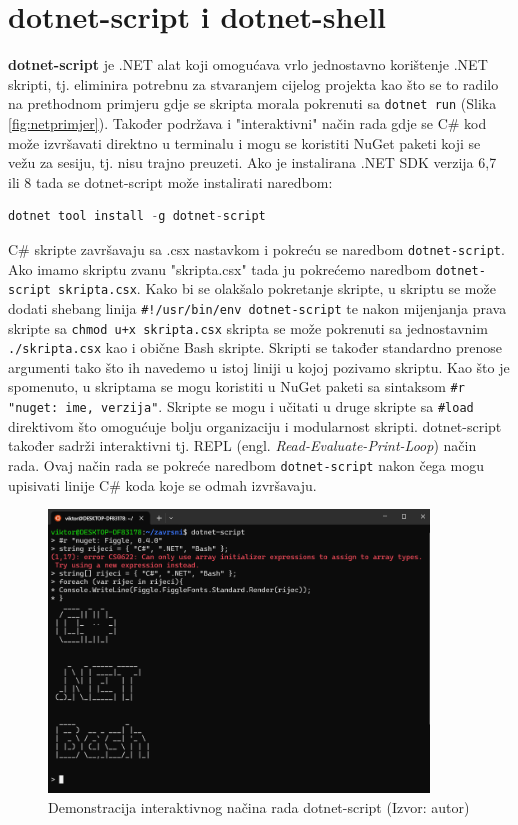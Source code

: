 \documentclass{foi}
\begin{document}
\chapter{dotnet-script i dotnet-shell}
\textbf{dotnet-script} je .NET alat koji omogućava vrlo jednostavno korištenje .NET skripti, tj. eliminira potrebnu za stvaranjem cijelog projekta kao što se to radilo na prethodnom primjeru gdje se skripta morala pokrenuti sa \verb|dotnet run| (Slika \ref{fig:netprimjer}). Također podržava i "interaktivni" način rada gdje se C\# kod može izvršavati direktno u terminalu i mogu se koristiti NuGet paketi koji se vežu za sesiju, tj. nisu trajno preuzeti. Ako je instalirana .NET SDK verzija 6,7 ili 8 tada se dotnet-script može instalirati naredbom\cite{gitscript}:
\begin{lstlisting}[language=C++]
dotnet tool install -g dotnet-script
\end{lstlisting}
C\# skripte završavaju sa .csx nastavkom i pokreću se naredbom \verb|dotnet-script|. Ako imamo skriptu zvanu "skripta.csx" tada ju pokrećemo naredbom \verb|dotnet-script skripta.csx|. Kako bi se olakšalo pokretanje skripte, u skriptu se može dodati shebang linija \texttt{\#!/usr/bin/env dotnet-script} te nakon mijenjanja prava skripte sa \verb|chmod u+x skripta.csx| skripta se može pokrenuti sa jednostavnim \verb|./skripta.csx| kao i obične Bash skripte. Skripti se također standardno prenose argumenti tako što ih navedemo u istoj liniji u kojoj pozivamo skriptu. Kao što je spomenuto, u skriptama se mogu koristiti u NuGet paketi sa sintaksom \verb|#r "nuget: ime, verzija"|. Skripte se mogu i učitati u druge skripte sa \verb|#load| direktivom što omogućuje bolju organizaciju i modularnost skripti\cite{gitscript}.
dotnet-script također sadrži interaktivni tj. REPL (engl. \textit{Read-Evaluate-Print-Loop}) način rada. Ovaj način rada se pokreće naredbom \verb|dotnet-script| nakon čega mogu upisivati linije C\# koda koje se odmah izvršavaju\cite{gitscript}. 
\begin{figure}[H]
    \centering
    \includegraphics[width=0.9\textwidth]{slike/script-repl.png}
    \caption{Demonstracija interaktivnog načina rada dotnet-script (Izvor: autor)}
    \label{fig:script-repl}
\end{figure}
\end{document}
